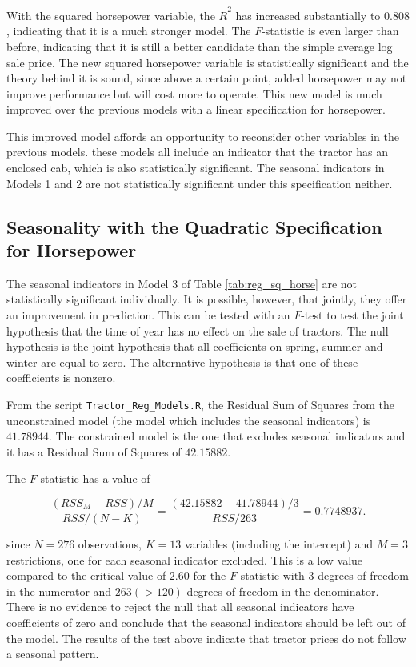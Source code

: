 \documentclass[11pt]{paper}
\begin{document}
With the squared horsepower variable, the $\bar{R}^2$ has increased substantially to $0.808$, indicating that it is a much stronger model. 
The $F$-statistic is even larger than before, indicating that it is still a better candidate than the simple average log sale price. 
The new squared horsepower variable is statistically significant and the theory behind it is sound, since above a certain point, added horsepower may not improve performance but will cost more to operate. 
This new model is much improved over the previous models with a linear specification for horsepower.

This improved model affords an opportunity
to reconsider other variables in the previous models.
these models all include an indicator that the
tractor has an enclosed cab, 
which is also statistically significant. 
The seasonal indicators in Models 1 and 2 are not statistically significant under this specification neither. 


\clearpage
\subsection{Seasonality with the Quadratic Specification for Horsepower}


The seasonal indicators in Model 3 
of Table \ref{tab:reg_sq_horse}
are not statistically significant individually.
It is possible, however, that jointly, they 
offer an improvement in prediction. 
This can be tested with an $F$-test
to test the joint hypothesis that the time of year has no effect on the sale of tractors. 
%
The null hypothesis is the joint hypothesis that all coefficients on spring, summer and winter are equal to zero. 
The alternative hypothesis is that one of these coefficients is nonzero. 
% 

From the script \texttt{Tractor\_Reg\_Models.R}, the Residual Sum of Squares from the unconstrained model (the model which includes the seasonal indicators) is $41.78944$. 
The constrained model is the one that excludes seasonal indicators and it has a Residual Sum of Squares of $42.15882$.

The $F$-statistic has a value of 

$$ 
\frac{(RSS_M - RSS)/M}{RSS/(N - K)} = \frac{(42.15882 - 41.78944)/3}{RSS/263} = 0.7748937. 
$$

since $N = 276$ observations, $K = 13$ 
variables (including the intercept) 
and $M = 3$ restrictions, one for each seasonal indicator excluded. 
This is a low value compared to the critical value of $2.60$ for the $F$-statistic with $3$ degrees of freedom in the numerator and $263 (> 120)$ degrees of freedom in the denominator. 
There is no evidence to reject the null that all seasonal indicators have coefficients of zero and conclude that the seasonal indicators should be left out of the model. 
%
The results of the test above indicate that tractor prices do not follow a seasonal pattern. 
\end{document}
